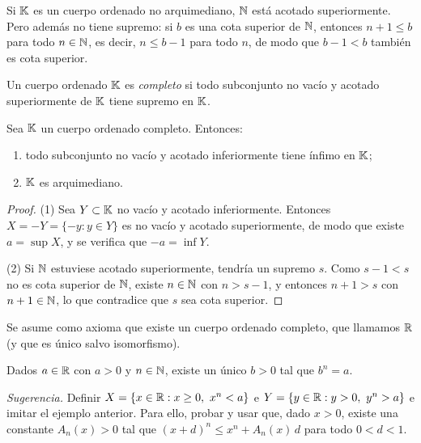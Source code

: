 Si \(\mathbb{K}\) es un cuerpo ordenado no arquimediano, \(\mathbb{N}\) está acotado superiormente. Pero además no tiene supremo: si \(b\) es una cota superior de \(\mathbb{N}\), entonces \(n + 1 \leq b\) para todo \(n \in \mathbb{N}\), es decir, \(n \leq b - 1\) para todo \(n\), de modo que \(b - 1 < b\) también es cota superior.

\begin{definition}
  Un cuerpo ordenado \(\mathbb{K}\) es \emph{completo} si todo subconjunto no vacío y acotado superiormente de \(\mathbb{K}\) tiene supremo en \(\mathbb{K}\).
\end{definition}

\begin{prop}
  Sea \(\mathbb{K}\) un cuerpo ordenado completo. Entonces:
  \begin{enumerate}[label=(\arabic*)]
    \item todo subconjunto no vacío y acotado inferiormente tiene ínfimo en \(\mathbb{K}\);
    \item \(\mathbb{K}\) es arquimediano.
  \end{enumerate}
\end{prop}

\begin{proof}
  (1) Sea \(Y \subset \mathbb{K}\) no vacío y acotado inferiormente. Entonces \(X = -Y = \{ -y : y \in Y \}\) es no vacío y acotado superiormente, de modo que existe \(a = \sup X\), y se verifica que \(-a = \inf Y\).

  (2) Si \(\mathbb{N}\) estuviese acotado superiormente, tendría un supremo \(s\). Como \(s - 1 < s\) no es cota superior de \(\mathbb{N}\), existe \(n \in \mathbb{N}\) con \(n > s - 1\), y entonces \(n + 1 > s\) con \(n + 1 \in \mathbb{N}\), lo que contradice que \(s\) sea cota superior.
\end{proof}

\begin{note}
  Se asume como axioma que existe un cuerpo ordenado completo, que llamamos \(\mathbb{R}\) (y que es único salvo isomorfismo).
\end{note}

\begin{ejercicio}
  Dados \(a \in \mathbb{R}\) con \(a > 0\) y \(n \in \mathbb{N}\), existe un único \(b > 0\) tal que \(b^n = a\).

  \emph{Sugerencia.} Definir \(X = \{ x \in \mathbb{R} : x \geq 0,\ x^n < a \}\) e \(Y = \{ y \in \mathbb{R} : y > 0,\ y^n > a \}\) e imitar el ejemplo anterior. Para ello, probar y usar que, dado \(x > 0\), existe una constante \(A_n(x) > 0\) tal que \({(x + d)}^n \leq x^n + A_n(x)\, d\) para todo \(0 < d < 1\).
\end{ejercicio}

